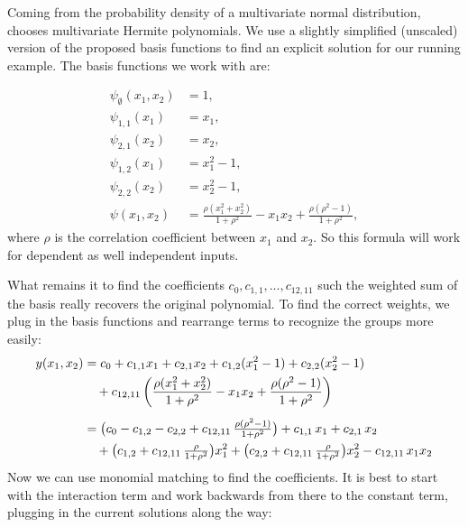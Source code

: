 Coming from the probability density of a multivariate normal distribution, \cite{rahman2014} chooses multivariate Hermite polynomials. We use a slightly simplified (unscaled) version of the proposed basis functions to find an explicit solution for our running example. The basis functions we work with are:

\begin{align*}
\psi_{\emptyset}(x_1,x_2) &= 1, \\[3pt]
\psi_{1,1}(x_1) &= x_1, \\[3pt]
\psi_{2,1}(x_2) &= x_2, \\[3pt]
\psi_{1,2}(x_1) &= x_1^2 - 1, \\[3pt]
\psi_{2,2}(x_2) &= x_2^2 - 1, \\[3pt]
\psi(x_1,x_2) &= \frac{\rho (x_1^2 + x_2^2)}{1 + \rho^2} - x_1 x_2 
+ \frac{\rho(\rho^2 - 1)}{1 + \rho^2},
\end{align*}
where $\rho$ is the correlation coefficient between $x_1$ and $x_2$. So this formula will work for dependent as well independent inputs.\par
What remains it to find the coefficients $c_0, c_{1,1}, \dots, c_{12, 11}$ such the weighted sum of the basis really recovers the original polynomial.
To find the correct weights, we plug in the basis functions and rearrange terms to recognize the groups more easily:
\begin{align*}
y(x_1,x_2) &= c_0 + c_{1,1} x_1 + c_{2,1} x_2 
+ c_{1,2}(x_1^2 - 1) + c_{2,2}(x_2^2 - 1) \notag \\ 
&\quad + c_{12, 11}\left( \frac{\rho(x_1^2 + x_2^2)}{1 + \rho^2} 
- x_1 x_2 
+ \frac{\rho(\rho^2 - 1)}{1 + \rho^2} \right) \\[5pt]
&= 
\big( c_0 - c_{1,2} - c_{2,2} + c_{12, 11}\,\tfrac{\rho(\rho^2 - 1)}{1+\rho^2} \big)
+ c_{1,1}\,x_1 
+ c_{2,1}\,x_2 \notag \\ 
&\quad + \big( c_{1,2} + c_{12, 11}\,\tfrac{\rho}{1+\rho^2} \big) x_1^2
+ \big( c_{2,2} + c_{12, 11}\,\tfrac{\rho}{1+\rho^2} \big) x_2^2
- c_{12, 11}\, x_1 x_2
\end{align*}
Now we can use monomial matching to find the coefficients. It is best to start with the interaction term and work backwards from there to the constant term, plugging in the current solutions along the way:

